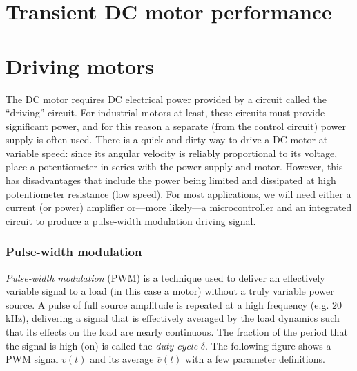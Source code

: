 \documentclass[dynamic_systems.tex]{subfiles}
\begin{document}
\section[Transient DC motor performance]{Transient DC motor performance}
\tags{}
\label{lec:transient_dc_motor_performance}






\section{Driving motors} 
\tags{}
\label{lec:driving_motors}

The DC motor requires DC electrical power provided by a circuit called
the ``driving'' circuit. For industrial motors at least, these circuits
must provide significant power, and for this reason a separate (from the
control circuit) power supply is often used. There is a quick-and-dirty
way to drive a DC motor at variable speed: since its angular velocity is
reliably proportional to its voltage, place a potentiometer in series
with the power supply and motor. However, this has disadvantages that
include the power being limited and dissipated at high potentiometer
resistance (low speed). For most applications, we will need either a
current (or power) amplifier or---more likely---a microcontroller and an
integrated circuit to produce a pulse-width modulation driving signal.

\subsubsection{Pulse-width modulation}\label{pulse-width-modulation}
\tags{}

\emph{Pulse-width modulation} (PWM) is a technique used to deliver an
effectively variable signal to a load (in this case a motor) without a
truly variable power source. A pulse of full source amplitude is
repeated at a high frequency (e.g. \(20\) kHz), delivering a signal that
is effectively averaged by the load dynamics such that its effects on
the load are nearly continuous. The fraction of the period that the
signal is high (on) is called the \emph{duty cycle} \(\delta\). The
following figure shows a PWM signal \(v(t)\) and its average
\(\overline{v}(t)\) with a few parameter definitions.
\tags{}
\end{document}
